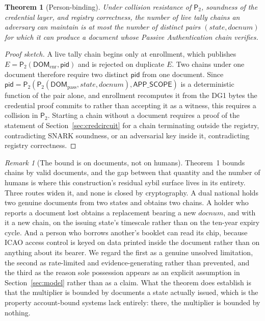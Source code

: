 \documentclass[11pt,a4paper]{article}
\theoremstyle{definition}
\theoremstyle{plain}
\newtheorem{theorem}{Theorem}
\theoremstyle{remark}
\newtheorem{remark}{Remark}
\newcommand{\pid}{\ensuremath{\mathsf{pid}}}
\newcommand{\PT}{\ensuremath{\mathsf{P}_2}}
\begin{document}
\begin{theorem}[Person-binding]
Under collision resistance of $\PT$, soundness of the credential layer, and registry correctness, the number of live tally chains an adversary can maintain is at most the number of distinct pairs $(\mathit{state}, \mathit{docnum})$ for which it can produce a document whose Passive Authentication chain verifies.
\end{theorem}
\begin{proof}[Proof sketch]
A live tally chain begins only at enrollment, which publishes $E = \PT(\mathsf{DOM}_{\mathrm{enr}}, \pid)$ and is rejected on duplicate $E$. Two chains under one document therefore require two distinct $\pid$ from one document. Since $\pid = \PT(\PT(\mathsf{DOM}_{\mathrm{pass}}, \mathit{state}, \mathit{docnum}), \mathsf{APP\_SCOPE})$ is a deterministic function of the pair alone, and enrollment recomputes it from the DG1 bytes the credential proof commits to rather than accepting it as a witness, this requires a collision in $\PT$. Starting a chain without a document requires a proof of the statement of Section~\ref{sec:credcircuit} for a chain terminating outside the registry, contradicting SNARK soundness, or an adversarial key inside it, contradicting registry correctness.
\end{proof}

\begin{remark}[The bound is on documents, not on humans]
\label{rem:docsnothumans}
Theorem~1 bounds chains by valid documents, and the gap between that quantity and the number of humans is where this construction's residual sybil surface lives in its entirety. Three routes widen it, and none is closed by cryptography. A dual national holds two genuine documents from two states and obtains two chains. A holder who reports a document lost obtains a replacement bearing a new $\mathit{docnum}$, and with it a new chain, on the issuing state's timescale rather than on the ten-year expiry cycle. And a person who borrows another's booklet can read its chip, because ICAO access control is keyed on data printed inside the document rather than on anything about its bearer. We regard the first as a genuine unsolved limitation, the second as rate-limited and evidence-generating rather than prevented, and the third as the reason sole possession appears as an explicit assumption in Section~\ref{sec:model} rather than as a claim. What the theorem does establish is that the multiplier is bounded by documents a state actually issued, which is the property account-bound systems lack entirely: there, the multiplier is bounded by nothing.
\end{remark}
\end{document}
